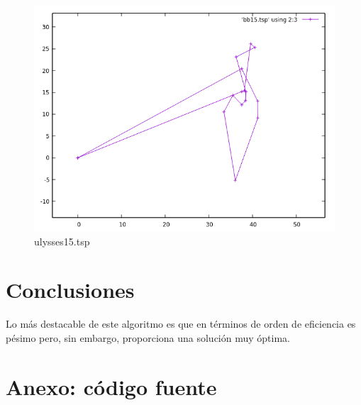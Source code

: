\documentclass[12pt,spanish]{article}
\begin{document}
\begin{figure}[H]
\centering
\includegraphics[scale=0.75]{bb15.png}
\caption{ulysses15.tsp}
\end{figure}

\section{Conclusiones}

Lo más destacable de este algoritmo es que en términos de orden de eficiencia es pésimo pero, sin embargo, proporciona una solución muy óptima.

\section{Anexo: código fuente}


\end{document}
